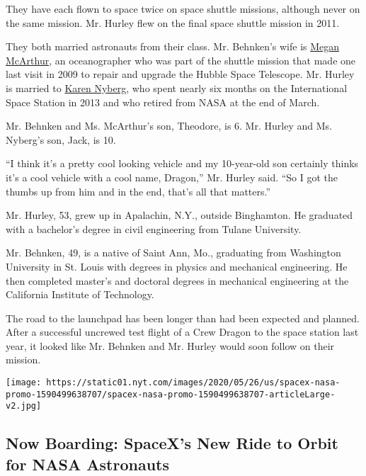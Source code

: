 They have each flown to space twice on space shuttle missions, although
never on the same mission. Mr. Hurley flew on the final space shuttle
mission in 2011.

They both married astronauts from their class. Mr. Behnken's wife is
\href{https://www.nasa.gov/astronauts/biographies/k-megan-mcarthur/biography}{Megan
McArthur}, an oceanographer who was part of the shuttle mission that
made one last visit in 2009 to repair and upgrade the Hubble Space
Telescope. Mr. Hurley is married to
\href{https://www.nasa.gov/astronauts/biographies/karen-l-nyberg/biography}{Karen
Nyberg}, who spent nearly six months on the International Space Station
in 2013 and who retired from NASA at the end of March.

Mr. Behnken and Ms. McArthur's son, Theodore, is 6. Mr. Hurley and Ms.
Nyberg's son, Jack, is 10.

``I think it's a pretty cool looking vehicle and my 10-year-old son
certainly thinks it's a cool vehicle with a cool name, Dragon,'' Mr.
Hurley said. ``So I got the thumbs up from him and in the end, that's
all that matters.''

Mr. Hurley, 53, grew up in Apalachin, N.Y., outside Binghamton. He
graduated with a bachelor's degree in civil engineering from Tulane
University.

Mr. Behnken, 49, is a native of Saint Ann, Mo., graduating from
Washington University in St. Louis with degrees in physics and
mechanical engineering. He then completed master's and doctoral degrees
in mechanical engineering at the California Institute of Technology.

The road to the launchpad has been longer than had been expected and
planned. After a successful uncrewed test flight of a Crew Dragon to the
space station last year, it looked like Mr. Behnken and Mr. Hurley would
soon follow on their mission.

\href{https://www.nytimes.com/interactive/2020/05/26/science/spacex-nasa.html}{}

\texttt{[image: https://static01.nyt.com/images/2020/05/26/us/spacex-nasa-promo-1590499638707/spacex-nasa-promo-1590499638707-articleLarge-v2.jpg]}

\hypertarget{now-boarding-spacexs-new-ride-to-orbit-for-nasa-astronauts}{%
\subsection{Now Boarding: SpaceX's New Ride to Orbit for NASA
Astronauts}\label{now-boarding-spacexs-new-ride-to-orbit-for-nasa-astronauts}}

